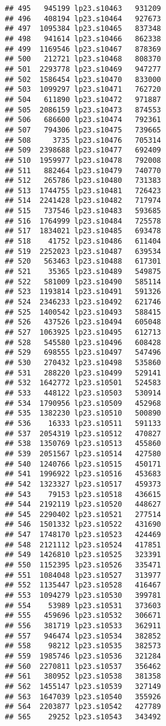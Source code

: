 \documentclass[
]{article}
\begin{document}
\begin{verbatim}
## 495   945199 lp23.s10463   931209
## 496   408194 lp23.s10464   927673
## 497  1095384 lp23.s10465   837348
## 498   941614 lp23.s10466   862338
## 499  1169546 lp23.s10467   878369
## 500   212721 lp23.s10468   808370
## 501  2293778 lp23.s10469   947277
## 502  1586454 lp23.s10470   833000
## 503  1099297 lp23.s10471   762720
## 504   611890 lp23.s10472   971887
## 505  2086159 lp23.s10473   874553
## 506   686600 lp23.s10474   792361
## 507   794306 lp23.s10475   739665
## 508     3735 lp23.s10476   705314
## 509  2398688 lp23.s10477   692409
## 510  1959977 lp23.s10478   792008
## 511   882464 lp23.s10479   740770
## 512   265786 lp23.s10480   731383
## 513  1744755 lp23.s10481   726423
## 514  2241428 lp23.s10482   717974
## 515   737546 lp23.s10483   593685
## 516  1764999 lp23.s10484   725578
## 517  1834021 lp23.s10485   693478
## 518    41752 lp23.s10486   611404
## 519  2252023 lp23.s10487   639534
## 520   563463 lp23.s10488   617301
## 521    35365 lp23.s10489   549875
## 522   581009 lp23.s10490   585114
## 523  1193814 lp23.s10491   591326
## 524  2346233 lp23.s10492   621746
## 525  1400542 lp23.s10493   588415
## 526   437526 lp23.s10494   605048
## 527  1063925 lp23.s10495   612713
## 528   545580 lp23.s10496   608428
## 529   698555 lp23.s10497   547496
## 530   270432 lp23.s10498   535860
## 531   288220 lp23.s10499   529141
## 532  1642772 lp23.s10501   524583
## 533   448122 lp23.s10503   530914
## 534  1790956 lp23.s10509   452968
## 535  1382230 lp23.s10510   500890
## 536    16333 lp23.s10511   591133
## 537  2054319 lp23.s10512   470827
## 538  1350769 lp23.s10513   455860
## 539  2051567 lp23.s10514   427580
## 540  1240766 lp23.s10515   450171
## 541  1996922 lp23.s10516   453683
## 542  1323327 lp23.s10517   459373
## 543    79153 lp23.s10518   436615
## 544  2192119 lp23.s10520   448627
## 545  2290402 lp23.s10521   277514
## 546  1501332 lp23.s10522   431690
## 547  1748170 lp23.s10523   424469
## 548  2121112 lp23.s10524   417851
## 549  1426810 lp23.s10525   323391
## 550  1152395 lp23.s10526   335471
## 551  1084048 lp23.s10527   313977
## 552  1135447 lp23.s10528   416467
## 553  1094279 lp23.s10530   399781
## 554    53989 lp23.s10531   373603
## 555   459696 lp23.s10532   306671
## 556   381719 lp23.s10533   362911
## 557   946474 lp23.s10534   382852
## 558    98212 lp23.s10535   382573
## 559  1985746 lp23.s10536   321284
## 560  2270811 lp23.s10537   356462
## 561   380952 lp23.s10538   381358
## 562  1455147 lp23.s10539   327149
## 563  1647039 lp23.s10540   355926
## 564  2203877 lp23.s10542   427789
## 565    29252 lp23.s10543   343492

\end{verbatim}
\end{document}
